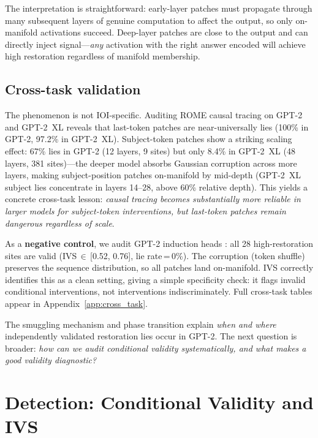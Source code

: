 \documentclass{article}
\begin{document}
The interpretation is straightforward: early-layer patches must propagate through many subsequent layers of genuine computation to affect the output, so only on-manifold activations succeed. Deep-layer patches are close to the output and can directly inject signal---\emph{any} activation with the right answer encoded will achieve high restoration regardless of manifold membership.

\subsection{Cross-task validation}

The phenomenon is not IOI-specific. Auditing ROME causal tracing \citep{meng2022locating} on GPT-2 and GPT-2~XL reveals that last-token patches are near-universally lies (100\% in GPT-2, 97.2\% in GPT-2~XL). Subject-token patches show a striking scaling effect: 67\% lies in GPT-2 (12 layers, 9 sites) but only 8.4\% in GPT-2~XL (48 layers, 381 sites)---the deeper model absorbs Gaussian corruption across more layers, making subject-position patches on-manifold by mid-depth (GPT-2~XL subject lies concentrate in layers 14--28, above 60\% relative depth). This yields a concrete cross-task lesson: \emph{causal tracing becomes substantially more reliable in larger models for subject-token interventions, but last-token patches remain dangerous regardless of scale}.

As a \textbf{negative control}, we audit GPT-2 induction heads \citep{olsson2022context}: all 28 high-restoration sites are valid (IVS\,$\in$\,[0.52, 0.76], lie rate\,=\,0\%). The corruption (token shuffle) preserves the sequence distribution, so all patches land on-manifold. IVS correctly identifies this as a clean setting, giving a simple specificity check: it flags invalid conditional interventions, not interventions indiscriminately. Full cross-task tables appear in Appendix~\ref{app:cross_task}.

The smuggling mechanism and phase transition explain \emph{when and where} independently validated restoration lies occur in GPT-2. The next question is broader: \emph{how can we audit conditional validity systematically, and what makes a good validity diagnostic?}

\section{Detection: Conditional Validity and IVS}
\label{sec:detection}
\end{document}
